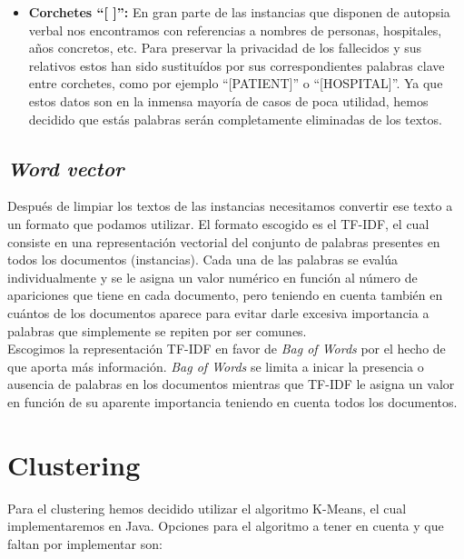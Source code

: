 \documentclass[10pt,a4paper]{article}
\begin{document}
\begin{itemize}
\begin{itemize}
\item \textbf{Corchetes ``[ ]'':} En gran parte de las instancias que disponen de autopsia verbal nos encontramos con referencias a nombres de personas, hospitales, años concretos, etc. Para preservar la privacidad de los fallecidos y sus relativos estos han sido sustituídos por sus correspondientes palabras clave entre corchetes, como por ejemplo ``[PATIENT]'' o ``[HOSPITAL]''. Ya que estos datos son en la inmensa mayoría de casos de poca utilidad, hemos decidido que estás palabras serán completamente eliminadas de los textos.
\end{itemize}
\end{itemize}

\subsection{\textit{Word vector}}
Después de limpiar los textos de las instancias necesitamos convertir ese texto a un formato que podamos utilizar. El formato escogido es el TF-IDF, el cual consiste en una representación vectorial del conjunto de palabras presentes en todos los documentos (instancias). Cada una de las palabras se evalúa individualmente y se le asigna un valor numérico en función al número de apariciones que tiene en cada documento, pero teniendo en cuenta también en cuántos de los documentos aparece para evitar darle excesiva importancia a palabras que simplemente se repiten por ser comunes.\\

Escogimos la representación TF-IDF en favor de \textit{Bag of Words} por el hecho de que aporta más información. \textit{Bag of Words} se limita a inicar la presencia o ausencia de palabras en los documentos mientras que TF-IDF le asigna un valor en función de su aparente importancia teniendo en cuenta todos los documentos.

\section{Clustering}
Para el clustering hemos decidido utilizar el algoritmo K-Means, el cual implementaremos en Java. Opciones para el algoritmo a tener en cuenta y que faltan por implementar son:
\end{document}
